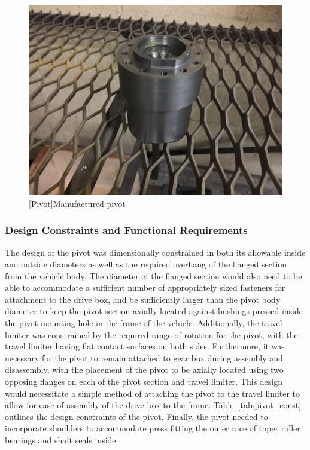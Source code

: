 \begin{figure}[htbp]
\centering
\includegraphics[height=0.3\textheight]{./images/pivot_bld}
[Pivot]{Manufactured pivot}
\label{fig:pivot_bld}
\end{figure}
\newpage



\subsubsection{Design Constraints and Functional Requirements}

The design of the pivot was dimensionally constrained in both its allowable inside and outside diameters as well as the required overhang of the flanged section from the vehicle body. The diameter of the flanged section would also need to be able to accommodate a sufficient number of appropriately sized fasteners for attachment to the drive box, and be sufficiently larger than the pivot body diameter to keep the pivot section axially located against bushings pressed inside the pivot mounting hole in the frame of the vehicle. Additionally, the travel limiter was constrained by the required range of rotation for the pivot, with the travel limiter having flat contact surfaces on both sides. Furthermore, it was necessary for the pivot to remain attached to gear box during assembly and disassembly, with the placement of the pivot to be axially located using two opposing flanges on each of the pivot section and travel limiter. This design would necessitate a simple method of attaching the pivot to the travel limiter to allow for ease of assembly of the drive box to the frame. Table~\ref{tab:pivot_const} outlines the design constraints of the pivot. Finally, the pivot needed to incorporate shoulders to accommodate press fitting the outer race of taper roller bearings and shaft seals inside.



